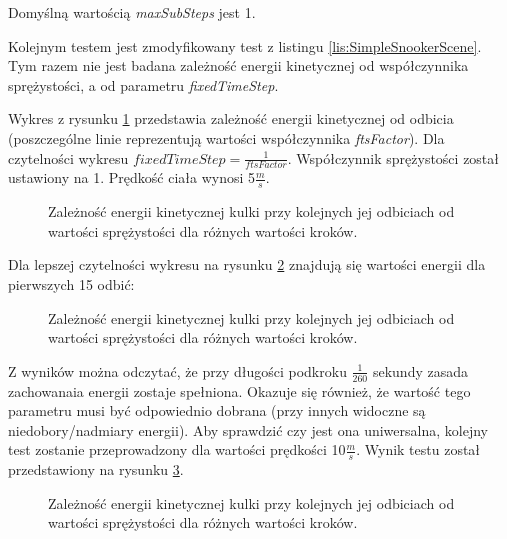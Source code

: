 Domyślną wartością \emph{maxSubSteps} jest 1.

Kolejnym testem jest zmodyfikowany test z listingu \ref{lis:SimpleSnookerScene}.
Tym razem nie jest badana zależność energii kinetycznej od współczynnika
sprężystości, a od parametru \emph{fixedTimeStep}. 



Wykres z rysunku \ref{fig:EKjednoCialoFTS} przedstawia zależność energii
kinetycznej od odbicia (poszczególne linie reprezentują wartości współczynnika
\emph{ftsFactor}). Dla czytelności wykresu $ fixedTimeStep =
\frac{1}{ftsFactor} $. Współczynnik sprężystości został ustawiony na 1.
Prędkość ciała wynosi 5$\frac{m}{s}$.

\begin{figure}[H]

\caption{Zależność energii kinetycznej kulki przy kolejnych jej odbiciach od wartości
sprężystości dla różnych wartości kroków.}
\label{fig:EKjednoCialoFTS}
\end{figure}

\newpage
Dla lepszej czytelności wykresu na rysunku \ref{fig:EKjednoCialoFTSz} znajdują
się wartości energii dla pierwszych 15 odbić:

\begin{figure}[H]

\caption{Zależność energii kinetycznej kulki przy kolejnych jej odbiciach od wartości
sprężystości dla różnych wartości kroków.}
\label{fig:EKjednoCialoFTSz}
\end{figure}

Z wyników można odczytać, że przy długości podkroku $ \frac{1}{260} $ sekundy
zasada zachowanaia energii zostaje spełniona. Okazuje się również, że wartość
tego parametru musi być odpowiednio dobrana (przy innych widoczne są
niedobory/nadmiary energii). Aby sprawdzić czy jest ona uniwersalna, kolejny
test zostanie przeprowadzony dla wartości prędkości 10$\frac{m}{s}$. Wynik testu
został przedstawiony na rysunku \ref{fig:EKjednoCialoFTS10}.

\begin{figure}[H]

\caption{Zależność energii kinetycznej kulki przy kolejnych jej odbiciach od wartości
sprężystości dla różnych wartości kroków.}
\label{fig:EKjednoCialoFTS10}
\end{figure}

